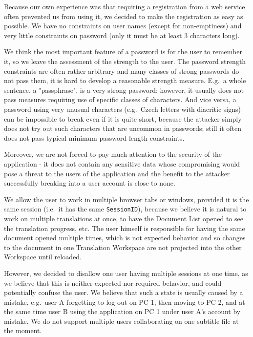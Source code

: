{Because our own experience was that requiring a registration from a web service often prevented us from using it, we decided to make the registration as easy as possible. We have no constraints on user names (except for non-emptiness) and very little constraints on password (only it must be at least 3 characters long).

We think the most important feature of a password is for the user to remember it, so we leave the assessment of the strength to the user. The password strength constraints are often rather arbitrary and many classes of strong passwords do not pass them, it is hard to develop a reasonable strength measure. E.g.\ a whole sentence, a "passphrase", is a very strong password; however, it usually does not pass measures requiring use of specific classes of characters. And vice versa, a password using very unusual characters (e.g.\ Czech letters with diacritic signs) can be impossible to break even if it is quite short, because the attacker simply does not try out such characters that are uncommon in passwords; still it often does not pass typical minimum password length constraints.

Moreover, we are not forced to pay much attention to the security of the application - it does not contain any sensitive data whose compromising would pose a threat to the users of the application and the benefit to the attacker successfully breaking into a user account is close to none.

We allow the user to work in multiple browser tabs or windows, provided it is the same session (i.e.\ it has the same {\tt SessionID}), because we believe it is natural to work on multiple translations at once, to have the Document List opened to see the translation progress, etc. The user himself is responsible for having the same document opened multiple times, which is not expected behavior and so changes to the document in one Translation Workspace are not projected into the other Workspace until reloaded.

However, we decided to disallow one user having multiple sessions at one time, as we believe that this is neither expected nor required behavior, and could potentially confuse the user. We believe that such a state is usually caused by a mistake, e.g.\ user A forgetting to log out on PC 1, then moving to PC 2, and at the same time user B using the application on PC 1 under user A's account by mistake.
We do not support multiple users collaborating on one subtitle file at the moment.

}
